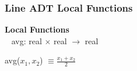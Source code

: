 \documentclass[t,12pt,numbers,fleqn,handout]{beamer}
\begin{document}

\begin{frame}
\frametitle{Line ADT Local Functions}

\textbf{Local Functions}\\
~\newline
avg: real $\times$ real $\rightarrow$ real

\noindent avg($x_1, x_2$) $\equiv \frac{x_1 + x_2}{2}$

\end{frame}




\end{document}
